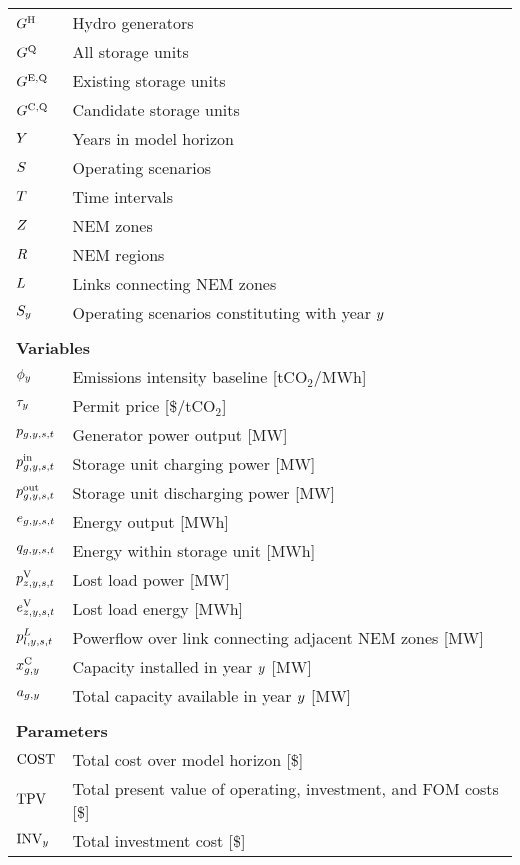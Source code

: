 \documentclass{article}
\begin{document}
\begin{longtable}{ p{}  p{}}
		$G^{\mathrm{H}}$ & Hydro generators\\
		$G^{\mathrm{Q}}$ & All storage units\\
		$G^{\mathrm{E,Q}}$ & Existing storage units\\
		$G^{\mathrm{C,Q}}$ & Candidate storage units\\
		$Y$ & Years in model horizon\\
		$S$ & Operating scenarios\\
		$T$ & Time intervals\\
		$Z$ & NEM zones\\
		$R$ & NEM regions\\
		$L$ & Links connecting NEM zones\\
		$S_{y}$ & Operating scenarios constituting with year $y$\\
		& \\
		\multicolumn{2}{l}{\textbf{Variables}}\\
		$\phi_{y}$ & Emissions intensity baseline [tCO$_{2}$/MWh]\\
		$\tau_{y}$ & Permit price [\$/tCO$_{2}$]\\
		$p_{g,y,s,t}$ & Generator power output [MW]\\
		$p^{\mathrm{in}}_{g,y,s,t}$ & Storage unit charging power [MW]\\
		$p^{\mathrm{out}}_{g,y,s,t}$ & Storage unit discharging power [MW]\\
		$e_{g,y,s,t}$ & Energy output [MWh]\\
		$q_{g,y,s,t}$ & Energy within storage unit [MWh]\\
		$p^{\mathrm{V}}_{z,y,s,t}$ & Lost load power [MW]\\
		$e^{\mathrm{V}}_{z,y,s,t}$ & Lost load energy [MWh]\\
		$p^{L}_{l,y,s,t}$ & Powerflow over link connecting adjacent NEM zones [MW]\\
		$x^{\mathrm{C}}_{g,y}$ & Capacity installed in year $y$ [MW]\\
		$a_{g,y}$ & Total capacity available in year $y$ [MW]\\
		& \\
		\multicolumn{2}{l}{\textbf{Parameters}}\\
		$\mathrm{COST}$ & Total cost over model horizon [\$]\\
		$\mathrm{TPV}_{}$ & Total present value of operating, investment, and FOM costs [\$]\\
		$\mathrm{INV}_{y}$ & Total investment cost [\$]\\

\end{longtable}
\end{document}
